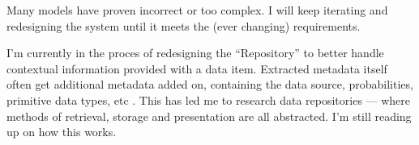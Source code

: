 Many models have proven incorrect or too complex. I will keep iterating and
redesigning the system until it meets the (ever changing) requirements.

I'm currently in the proces of redesigning the ``Repository'' to better handle
contextual information provided with a data item. Extracted metadata itself
often get additional metadata added on, containing the data source,
probabilities, primitive data types, etc \cite{metadata:aalemu-stevens}.
This has led me to research data repositories --- where methods of retrieval,
storage and presentation are all abstracted. I'm still reading up on how this
works.

